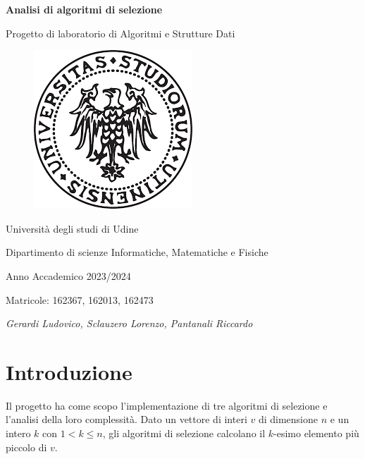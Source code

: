 \documentclass[a4paper]{article}
\begin{document}
\begin{titlepage} %
    \begin{center}
        \vspace*{1cm}
        {\Huge\bfseries Analisi di algoritmi di selezione\par}
        \vspace{.5cm}
        {\LARGE Progetto di laboratorio di Algoritmi e Strutture Dati\par}
        \vspace{1cm}
        \begin{figure}[h]
            \centering
            \includegraphics[width=.5\textwidth]{photo/uniud_logo.png}
        \end{figure}
        \vspace{1.5cm}
        {\LARGE Università degli studi di Udine\par}
        {\LARGE Dipartimento di scienze Informatiche, Matematiche e Fisiche\par}
        \vfill
        {\Large Anno Accademico 2023/2024\par}
        {\Large Matricole: 162367, 162013, 162473\par}
        {\Large\itshape Gerardi Ludovico, Sclauzero Lorenzo, Pantanali Riccardo\par}
    \end{center}
\end{titlepage}



\section{Introduzione}
Il progetto ha come scopo l'implementazione di tre algoritmi di selezione e l'analisi della loro complessità.
Dato un vettore di interi $v$ di dimensione $n$ e un intero $k$ con $1 < k \le n$, gli algoritmi di selezione calcolano il $k$-esimo elemento più piccolo di $v$.
\end{document}
